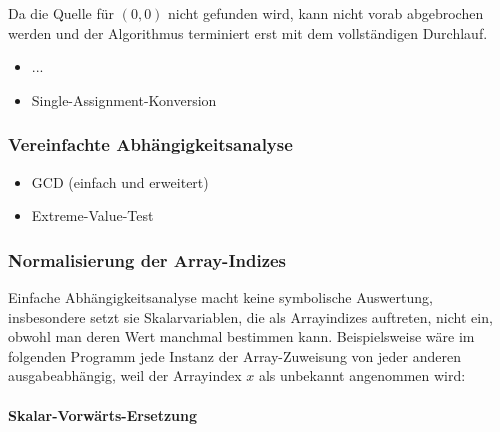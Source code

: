 Da die Quelle für \( (0,0) \) nicht gefunden wird, kann nicht vorab abgebrochen werden und der Algorithmus terminiert erst mit dem vollständigen Durchlauf.
    \begin{itemize}
        \item ...
        \item Single-Assignment-Konversion
    \end{itemize}
\subsubsection{Vereinfachte Abhängigkeitsanalyse}
    \begin{itemize}
        \item GCD (einfach und erweitert)
        \item Extreme-Value-Test
    \end{itemize}


\subsubsection{Normalisierung der Array-Indizes}

Einfache Abhängigkeitsanalyse macht keine symbolische Auswertung,
insbesondere setzt sie Skalarvariablen, die als Arrayindizes auftreten,
nicht ein, obwohl man deren Wert manchmal bestimmen kann. Beispielsweise
wäre im folgenden Programm jede Instanz der Array-Zuweisung von jeder
anderen ausgabeabhängig, weil der Arrayindex $x$ als unbekannt
angenommen wird:


\begin{procedure}
\SetAlgoLined
{}
\end{procedure}

\paragraph{Skalar-Vorwärts-Ersetzung}
\label{sec:sve}

